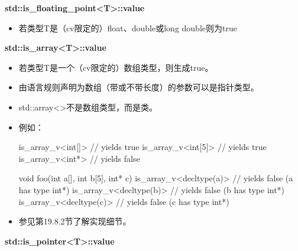 \textbf{std::is\_floating\_point<T>::value}

\begin{itemize}
\item 
若类型T是（cv限定的）float、double或long double则为true
\end{itemize}

\textbf{std::is\_array<T>::value}

\begin{itemize}
\item 
若类型T是一个（cv限定的）数组类型，则生成true。

\item 
由语言规则声明为数组（带或不带长度）的参数可以是指针类型。

\item 
std::array<>不是数组类型，而是类。

\item 
例如：

\begin{cpp}
is_array_v<int[]> // yields true
is_array_v<int[5]> // yields true
is_array_v<int*> // yields false

void foo(int a[], int b[5], int* c)
{
	is_array_v<decltype(a)> // yields false (a has type int*)
	is_array_v<decltype(b)> // yields false (b has type int*)
	is_array_v<decltype(c)> // yields false (c has type int*)
}
\end{cpp}

\item 
参见第19.8.2节了解实现细节。
\end{itemize}

\textbf{std::is\_pointer<T>::value}

